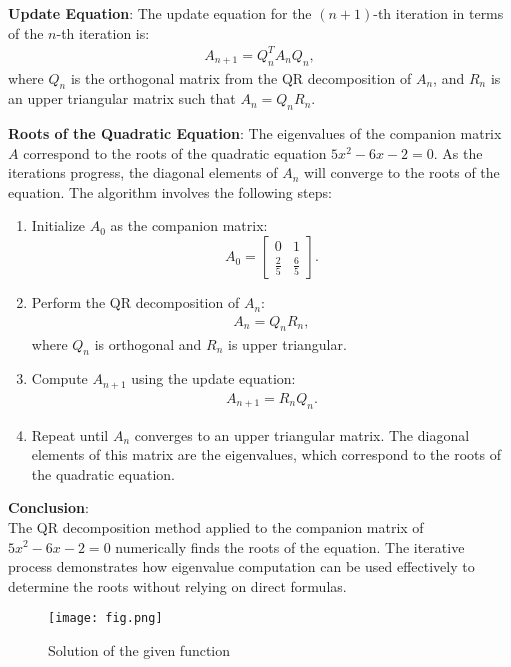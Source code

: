 \documentclass[journal]{IEEEtran}
\begin{document}
\textbf{Update Equation}:
The update equation for the $(n+1)$-th iteration in terms of the $n$-th iteration is:
\begin{align}
A_{n+1} = Q_n^T A_n Q_n,
\end{align}
where $Q_n$ is the orthogonal matrix from the QR decomposition of $A_n$, and $R_n$ is an upper triangular matrix such that $A_n = Q_n R_n$.

\textbf{Roots of the Quadratic Equation}:
The eigenvalues of the companion matrix $A$ correspond to the roots of the quadratic equation $5x^2 - 6x - 2 = 0$. As the iterations progress, the diagonal elements of $A_n$ will converge to the roots of the equation. The algorithm involves the following steps:
\begin{enumerate}
    \item Initialize $A_0$ as the companion matrix:
    \[
    A_0 = \begin{bmatrix}
    0 & 1 \\
    \frac{2}{5} & \frac{6}{5}
    \end{bmatrix}.
    \]

    \item Perform the QR decomposition of $A_n$:
    \begin{align}
    A_n = Q_n R_n,
    \end{align}
    where $Q_n$ is orthogonal and $R_n$ is upper triangular.

    \item Compute $A_{n+1}$ using the update equation:
    \begin{align}
    A_{n+1} = R_n Q_n.
    \end{align}

    \item Repeat until $A_n$ converges to an upper triangular matrix. The diagonal elements of this matrix are the eigenvalues, which correspond to the roots of the quadratic equation.
\end{enumerate}
\newpage

\textbf{Conclusion}:\\
The QR decomposition method applied to the companion matrix of $5x^2 - 6x - 2 = 0$ numerically finds the roots of the equation. The iterative process demonstrates how eigenvalue computation can be used effectively to determine the roots without relying on direct formulas.

\begin{figure}[!ht]
		\centering
		\texttt{[image: fig.png]}
		\caption{Solution of the given function}
		\label{stemplot}
	\end{figure}
\end{document}
